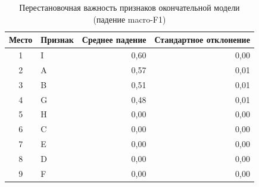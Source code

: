 \begin{table}[H]
\centering
\small
\caption{Перестановочная важность признаков окончательной модели (падение macro-F1)}\label{tab:importanceapp}
\begin{tabular}{clrr}
\toprule
Место & Признак & Среднее падение & Стандартное отклонение \\
\midrule
1 & I & 0,60 & 0,00 \\
2 & A & 0,57 & 0,01 \\
3 & B & 0,51 & 0,01 \\
4 & G & 0,48 & 0,01 \\
5 & H & 0,00 & 0,00 \\
6 & C & 0,00 & 0,00 \\
7 & E & 0,00 & 0,00 \\
8 & D & 0,00 & 0,00 \\
9 & F & 0,00 & 0,00 \\
\bottomrule
\end{tabular}
\end{table}